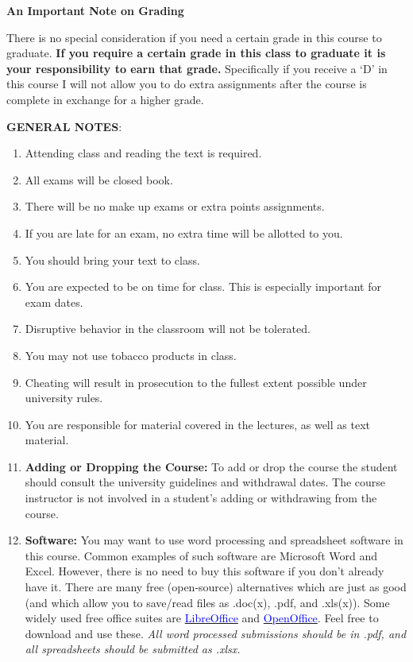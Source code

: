 \documentclass{article}
\begin{document}
\vspace*{5pt}
\begin{center}
{\bf An Important Note on Grading}
\end{center}
There is no special consideration if you need a certain grade in this course to
graduate. {\bf If you require a certain grade in this class to graduate it
is your responsibility to earn that grade.} Specifically if you receive a `D'
in this course I will not allow you to do extra assignments after the course is
complete in exchange for a higher grade.
\\
\begin{center}
{\bf GENERAL NOTES}:
\end{center}
\begin{enumerate}
\item Attending class and reading the text is required.
\item All exams will be closed book.
\item There will be no make up exams or extra points assignments.
\item If you are late for an exam, no extra time will be allotted to you.
\item You should bring your text to class.
\item You are expected to be on time for class. This is especially important for exam
dates.
\item Disruptive behavior in the classroom will not be tolerated.
\item You may not use tobacco products in class.
\item Cheating will result in prosecution to the fullest extent possible under university rules.
\item You are responsible for material covered in the lectures, as well as text material.
\item  {\bf Adding or Dropping the Course:} To add or drop the course the student should consult the university guidelines and withdrawal dates.
The course instructor is not involved in a student's adding or withdrawing from the course.
\item {\bf Software:} You may want to use word processing and spreadsheet software in
this course. Common examples of such software are Microsoft Word and
Excel. However, there is no need to buy this software if you don't already
have it. There are many free (open-source) alternatives which are just as
good (and which allow you to save/read files as .doc(x), .pdf, and .xls(x)).
Some widely used free office suites are \href{http://www.libreoffice.org}{\textcolor{blue}{LibreOffice}}
and  \href{http://www.openoffice.org}{\textcolor{blue}{OpenOffice}}. Feel free to download and use
these. {\it All word processed submissions should be in .pdf, and
all spreadsheets should be submitted as .xlsx.}
\end{enumerate}
\end{document}
